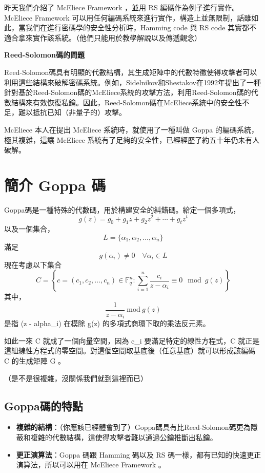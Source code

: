 \documentclass[
]{article}
\author{}
\date{}
\begin{document}
昨天我們介紹了 McEliece Framework ，並用 RS
編碼作為例子進行實作。McEliece Framework
可以用任何編碼系統來進行實作，構造上並無限制，話雖如此，當我們在進行密碼學的安全性分析時，Hamming
code 與 RS code
其實都不適合拿來實作該系統。（他們只能用於教學解說以及傳遞觀念）

\textbf{Reed-Solomon碼的問題}

Reed-Solomon碼具有明顯的代數結構，其生成矩陣中的代數特徵使得攻擊者可以利用這些結構來破解密碼系統。例如，Sidelnikov和Shestakov在1992年提出了一種針對基於Reed-Solomon碼的McEliece系統的攻擊方法，利用Reed-Solomon碼的代數結構來有效恢復私鑰。因此，Reed-Solomon碼在McEliece系統中的安全性不足，難以抵抗已知（非量子的）攻擊。

McEliece 本人在提出 McEliece 系統時，就使用了一種叫做 Goppa
的編碼系統，極其複雜，這讓 McEliece
系統有了足夠的安全性，已經經歷了約五十年仍未有人破解。

\hypertarget{ux7c21ux4ecb-goppa-ux78bc}{%
\section{簡介 Goppa 碼}\label{ux7c21ux4ecb-goppa-ux78bc}}

Goppa碼是一種特殊的代數碼，用於構建安全的糾錯碼。給定一個多項式， \[
g(z) = g_0 + g_1 z + g_2 z^2 + \cdots + g_t z^t
\] 以及一個集合， \[
L = \{\alpha_1, \alpha_2, \dots, \alpha_n\}
\] 滿足 \[
g(\alpha_i) \neq 0 \quad \forall \alpha_{i}\in L
\] 現在考慮以下集合 \[
C=\left\{ c = (c_1, c_2, \dots, c_n) \in \mathbb{F}_q^n : \sum_{i=1}^{n} \frac{c_i}{z - \alpha_i} \equiv 0 \mod g(z) \right\}
\] 其中， \[
\frac{1}{z-\alpha_{i}} \ \mathrm{mod} \ g(z) 
\] 是指 (z - alpha\_i) 在模除 g(z) 的多項式商環下取的乘法反元素。

如此一來 C 就成了一個向量空間，因為 c\_i 要滿足特定的線性方程式，C
就正是這組線性方程式的零空間。對這個空間取基底後（任意基底）就可以形成該編碼
C 的生成矩陣 G 。

（是不是很複雜，沒關係我們就到這裡而已）

\hypertarget{goppaux78bcux7684ux7279ux9ede}{%
\subsection{Goppa碼的特點}\label{goppaux78bcux7684ux7279ux9ede}}

\begin{itemize}
\item
  \textbf{複雜的結構}：（你應該已經體會到了）Goppa碼具有比Reed-Solomon碼更為隱蔽和複雜的代數結構，這使得攻擊者難以通過公鑰推斷出私鑰。
\item
  \textbf{更正演算法}：Goppa 碼跟 Hamming 碼以及 RS
  碼一樣，都有已知的快速更正演算法，所以可以用在 McEliece Framework 。
\end{itemize}
\end{document}
